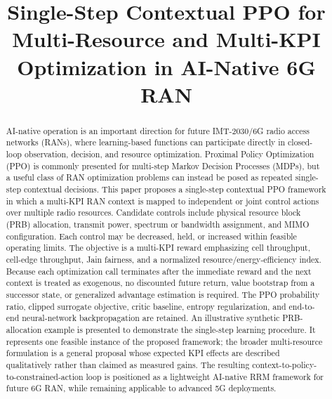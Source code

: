 \documentclass[conference]{IEEEtran}
\begin{document}

\title{Single-Step Contextual PPO for Multi-Resource and Multi-KPI Optimization in AI-Native 6G RAN}

\author{
}
\maketitle

\begin{abstract}
AI-native operation is an important direction for future IMT-2030/6G radio access networks (RANs), where learning-based functions can participate directly in closed-loop observation, decision, and resource optimization. Proximal Policy Optimization (PPO) is commonly presented for multi-step Markov Decision Processes (MDPs), but a useful class of RAN optimization problems can instead be posed as repeated single-step contextual decisions. This paper proposes a single-step contextual PPO framework in which a multi-KPI RAN context is mapped to independent or joint control actions over multiple radio resources. Candidate controls include physical resource block (PRB) allocation, transmit power, spectrum or bandwidth assignment, and MIMO configuration. Each control may be decreased, held, or increased within feasible operating limits. The objective is a multi-KPI reward emphasizing cell throughput, cell-edge throughput, Jain fairness, and a normalized resource/energy-efficiency index. Because each optimization call terminates after the immediate reward and the next context is treated as exogenous, no discounted future return, value bootstrap from a successor state, or generalized advantage estimation is required. The PPO probability ratio, clipped surrogate objective, critic baseline, entropy regularization, and end-to-end neural-network backpropagation are retained. An illustrative synthetic PRB-allocation example is presented to demonstrate the single-step learning procedure. It represents one feasible instance of the proposed framework; the broader multi-resource formulation is a general proposal whose expected KPI effects are described qualitatively rather than claimed as measured gains. The resulting context-to-policy-to-constrained-action loop is positioned as a lightweight AI-native RRM framework for future 6G RAN, while remaining applicable to advanced 5G deployments.
\end{abstract}
\end{document}
